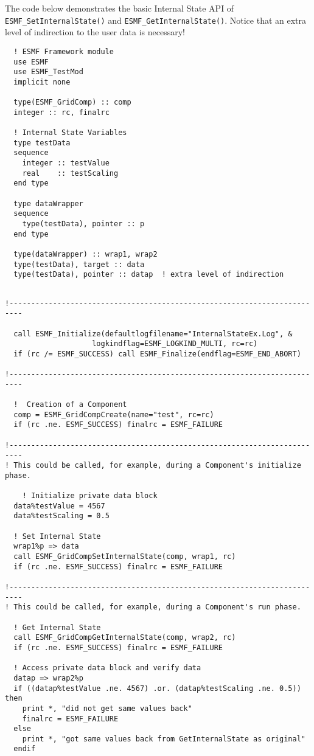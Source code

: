      The code below demonstrates the basic Internal State API
     of {\tt ESMF\_<Grid|Cpl>SetInternalState()} and
     {\tt ESMF\_<Grid|Cpl>GetInternalState()}. Notice that an extra level of
     indirection to the user data is necessary!
   

 \begin{verbatim}
  ! ESMF Framework module
  use ESMF
  use ESMF_TestMod
  implicit none
  
  type(ESMF_GridComp) :: comp
  integer :: rc, finalrc

  ! Internal State Variables
  type testData
  sequence
    integer :: testValue
    real    :: testScaling
  end type

  type dataWrapper
  sequence
    type(testData), pointer :: p
  end type

  type(dataWrapper) :: wrap1, wrap2
  type(testData), target :: data
  type(testData), pointer :: datap  ! extra level of indirection
 
\end{verbatim}
 

 \begin{verbatim}
!-------------------------------------------------------------------------
        
  call ESMF_Initialize(defaultlogfilename="InternalStateEx.Log", &
                    logkindflag=ESMF_LOGKIND_MULTI, rc=rc)
  if (rc /= ESMF_SUCCESS) call ESMF_Finalize(endflag=ESMF_END_ABORT)

!-------------------------------------------------------------------------

  !  Creation of a Component
  comp = ESMF_GridCompCreate(name="test", rc=rc)  
  if (rc .ne. ESMF_SUCCESS) finalrc = ESMF_FAILURE 

!-------------------------------------------------------------------------
! This could be called, for example, during a Component's initialize phase.

    ! Initialize private data block
  data%testValue = 4567
  data%testScaling = 0.5

  ! Set Internal State
  wrap1%p => data
  call ESMF_GridCompSetInternalState(comp, wrap1, rc)
  if (rc .ne. ESMF_SUCCESS) finalrc = ESMF_FAILURE 

!-------------------------------------------------------------------------
! This could be called, for example, during a Component's run phase.

  ! Get Internal State
  call ESMF_GridCompGetInternalState(comp, wrap2, rc)
  if (rc .ne. ESMF_SUCCESS) finalrc = ESMF_FAILURE 

  ! Access private data block and verify data
  datap => wrap2%p 
  if ((datap%testValue .ne. 4567) .or. (datap%testScaling .ne. 0.5)) then
    print *, "did not get same values back"
    finalrc = ESMF_FAILURE
  else
    print *, "got same values back from GetInternalState as original"
  endif

 
\end{verbatim}

\setlength{\parskip}{\oldparskip}
\setlength{\parindent}{\oldparindent}
\setlength{\baselineskip}{\oldbaselineskip}
